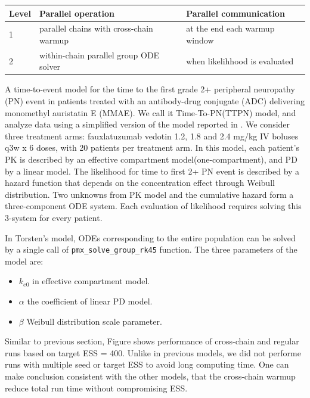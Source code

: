 \documentclass[landscape,a0paper,fontscale=0.5]{baposter} %
\begin{document}
\begin{poster}
{\begin{multicols}{2}
\begin{center}
\begin{tabular}{l l l}
\hline
Level & Parallel operation & Parallel communication \\
\hline
1 & parallel chains with cross-chain warmup & at the end each warmup window \\
2 & within-chain parallel group ODE solver & when likelihhood is evaluated \\
\hline
\end{tabular}
\end{center}

A time-to-event model for the time to the first grade 2+ peripheral neuropathy (PN)
event in patients treated with an antibody-drug conjugate (ADC)
delivering monomethyl auristatin E (MMAE). We call it
Time-To-PN(TTPN) model, and analyze data using a
simplified version of the model reported in
\cite{lu_time--event_2017}. We consider three treatment arms:
fauxlatuzumab vedotin 1.2, 1.8 and 2.4 mg/kg IV boluses q3w x 6 doses,
with 20 patients per treatment arm. In this model,
each patient's PK is described by an effective compartment model(one-compartment),
and PD by a linear model. The likelihood for time to first 2+ PN event
is described by a hazard function that depends on the concentration
effect through Weibull distribution. Two unknowns from
PK model and the cumulative hazard form a three-component
ODE system. Each evaluation of likelihood requires solving this
3-system for every patient. 

In Torsten's model, ODEs corresponding to the entire
population can be solved by a single call of \texttt{\texttt{pmx\_solve\_group\_rk45}} function. The three parameters of the
model are:
\begin{itemize}
\item \(k_{e0}\) in effective compartment model.
\item \(\alpha\) the coefficient of linear PD model.
\item \(\beta\) Weibull distribution scale parameter.
\end{itemize}

Similar to previous section, Figure shows performance of cross-chain and
regular runs based on target ESS = 400. Unlike in previous models, we
did not performe runs with multiple seed or target ESS to avoid long
computing time. One can make conclusion consistent with the other
models, that the cross-chain warmup reduce total run time without
compromising ESS.


\end{multicols}}
\end{poster}
\end{document}
